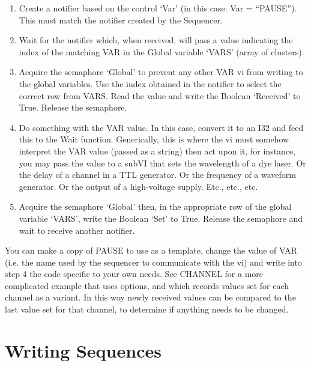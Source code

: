 \documentclass[10pt,a4paper]{article}
\begin{document}
\begin{enumerate}
	\item %
	Create a notifier based on the control `Var' (in this case: Var = ``PAUSE'').  This must match the notifier created by the Sequencer.
	\item %
	Wait for the notifier which, when received, will pass a value indicating the index of the matching VAR in the Global variable `VARS' (array of clusters).
	\item %
	Acquire the semaphore `Global' to prevent any other VAR vi from writing to the global variables.  Use the index obtained in the notifier to select the correct row from VARS.  Read the value and write the Boolean `Received' to True.  Release the semaphore.
	\item %
	Do something with the VAR value.  In this case, convert it to an I32 and feed this to the  Wait function.  Generically, this is where the vi must somehow interpret the VAR value (passed as a string) then act upon it, for instance, you may pass the value to a subVI that sets the wavelength of a dye laser. Or the delay of a channel in a TTL generator. Or the frequency of a waveform generator. Or the output of a high-voltage supply. Etc., etc., etc.
	\item %
	Acquire the semaphore `Global' then, in the appropriate row of the global variable `VARS', write the Boolean `Set' to True.   Release the semaphore and wait to receive another notifier.
\end{enumerate} 

You can make a copy of PAUSE to use as a template, change the value of VAR (i.e. the name used by the sequencer to communicate with the vi) and write into step 4 the code specific to your own needs.  See CHANNEL for a more complicated example that uses options, and which records values set for each channel as a variant.  In this way newly received values can be compared to the last value set for that channel, to determine if anything needs to be changed.

\section{Writing Sequences}
\end{document}
